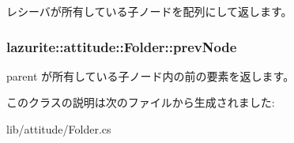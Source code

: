 \label{classlazurite_1_1attitude_1_1_folder_a0ca3f357b5238a0a3f0e4f930ded5a22}
レシーバが所有している子ノードを配列にして返します。 \hypertarget{classlazurite_1_1attitude_1_1_folder_af6e1c1d3572674d0377e4f9023c44f73}{
\subsubsection[{prevNode}]{ lazurite::attitude::Folder::prevNode}}
\label{classlazurite_1_1attitude_1_1_folder_af6e1c1d3572674d0377e4f9023c44f73}
parent が所有している子ノード内の前の要素を返します。 

このクラスの説明は次のファイルから生成されました:\begin{DoxyCompactItemize}
\item 
lib/attitude/Folder.cs\end{DoxyCompactItemize}
